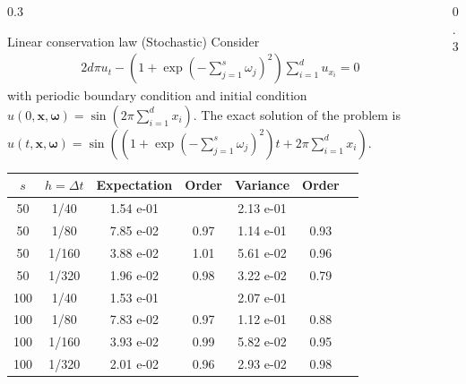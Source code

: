 \documentclass{msuposter}
\newcommand{\colwidth}{0.3\linewidth}
\begin{document}
\begin{frame}{}
\begin{columns}[t]
\begin{column}{\colwidth}
\begin{exampleblock}{Linear conservation law (Stochastic)}
\large
Consider 
\begin{equation}\label{eqn:linear3Dstochastic}
	\begin{aligned}
		2 d  \pi u_t  - (1+\exp(-\sum_{j=1}^s \omega_j)^2) \sum_{i=1}^d u_{x_i}  = 0 
	\end{aligned}
\end{equation}
with periodic boundary condition and initial condition $u(0,\boldsymbol{x},\boldsymbol{\omega}) = \sin\left(2\pi \sum_{i=1}^d x_i \right) $. The exact solution of the problem is $u(t,\boldsymbol{x},\boldsymbol{\omega}) = \sin\left((1+\exp(-\sum_{j=1}^s \omega_j)^2) t + 2\pi \sum_{i=1}^d x_i\right)$.
\begin{table}[ht]
 \centering
 \begin{tabular}{|c|c|c|c|c|c|c|}
 \hline
     $s$ & $h = \Delta t$ &  Expectation & Order & Variance  & Order\\
 	\hline
     50 & 1/40 & 1.54 e-01 & & 2.13 e-01 &  \\
     50 & 1/80 & 7.85 e-02 & 0.97 & 1.14 e-01 & 0.93 \\
     50 & 1/160 & 3.88 e-02 & 1.01 & 5.61 e-02 & 0.96\\
     50 & 1/320 & 1.96 e-02 & 0.98 & 3.22 e-02 & 0.79\\
    \hline
	 100 & 1/40 & 1.53 e-01 &  & 2.07 e-01 & \\
	 100 & 1/80 & 7.83 e-02 & 0.97 &  1.12 e-01 & 0.88\\
	 100 & 1/160 & 3.93 e-02 & 0.99 & 5.82 e-02 & 0.95\\
	 100 & 1/320 & 2.01 e-02 & 0.96 &  2.93 e-02 & 0.98\\
\hline
 \end{tabular}
\label{tbl:cv error stochastic}	
\end{table}
\end{exampleblock}


\end{column}




\begin{column}{\colwidth}


\end{column}
\end{columns}
\end{frame}
\end{document}
